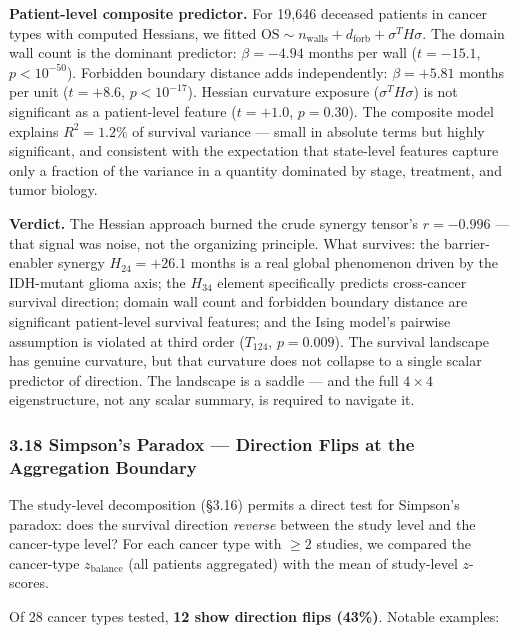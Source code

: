 \documentclass[
  11pt,
]{article}
\begin{document}
\textbf{Patient-level composite predictor.} For 19,646 deceased patients
in cancer types with computed Hessians, we fitted
\(\mathrm{OS} \sim n_\mathrm{walls} + d_\mathrm{forb} + \sigma^T H \sigma\).
The domain wall count is the dominant predictor: \(\beta = -4.94\)
months per wall (\(t = -15.1\), \(p < 10^{-50}\)). Forbidden boundary
distance adds independently: \(\beta = +5.81\) months per unit
(\(t = +8.6\), \(p < 10^{-17}\)). Hessian curvature exposure
(\(\sigma^T H \sigma\)) is not significant as a patient-level feature
(\(t = +1.0\), \(p = 0.30\)). The composite model explains
\(R^2 = 1.2\%\) of survival variance --- small in absolute terms but
highly significant, and consistent with the expectation that state-level
features capture only a fraction of the variance in a quantity dominated
by stage, treatment, and tumor biology.

\textbf{Verdict.} The Hessian approach burned the crude synergy tensor's
\(r = -0.996\) --- that signal was noise, not the organizing principle.
What survives: the barrier-enabler synergy \(H_{24} = +26.1\) months is
a real global phenomenon driven by the IDH-mutant glioma axis; the
\(H_{34}\) element specifically predicts cross-cancer survival
direction; domain wall count and forbidden boundary distance are
significant patient-level survival features; and the Ising model's
pairwise assumption is violated at third order (\(T_{124}\),
\(p = 0.009\)). The survival landscape has genuine curvature, but that
curvature does not collapse to a single scalar predictor of direction.
The landscape is a saddle --- and the full \(4 \times 4\)
eigenstructure, not any scalar summary, is required to navigate it.

\subsubsection{3.18 Simpson's Paradox --- Direction Flips at the
Aggregation
Boundary}\label{simpsons-paradox-direction-flips-at-the-aggregation-boundary}

The study-level decomposition (§3.16) permits a direct test for
Simpson's paradox: does the survival direction \emph{reverse} between
the study level and the cancer-type level? For each cancer type with
\(\geq 2\) studies, we compared the cancer-type \(z_\mathrm{balance}\)
(all patients aggregated) with the mean of study-level \(z\)-scores.

Of 28 cancer types tested, \textbf{12 show direction flips (43\%)}.
Notable examples:
\end{document}
